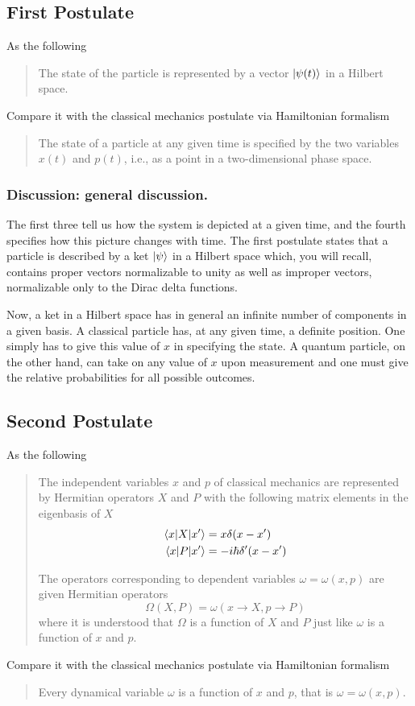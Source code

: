 \documentclass[../../../main.tex]{subfiles}
\begin{document}
\subsection{First Postulate}
As the following
\begin{quotation}
    The state of the particle is represented by a vector $\ket{\psi(t)}$ in a Hilbert space.
\end{quotation}
Compare it with the classical mechanics postulate via Hamiltonian formalism
\begin{quotation}
    The state of a particle at any given time is specified by the two variables $x(t)$ and $p(t)$, i.e., as a point in a two-dimensional phase space.
\end{quotation}

\subsubsection{Discussion: general discussion.}
The first three tell us how the system is depicted at a given time, and the fourth specifies how this picture changes with time.
The first postulate states that a particle is described by a ket $\ket{\psi} $ in a Hilbert space which, you will recall, contains proper vectors normalizable to unity as well as improper vectors, normalizable only to the Dirac delta functions.

Now, a ket in a Hilbert space has in general an infinite number of components in a given basis.
A classical particle has, at any given time, a definite position.
One simply has to give this value of $x$ in specifying the state.
A quantum particle, on the other hand, can take on any value of $x$ upon measurement and one must give the relative probabilities for all possible outcomes.

\subsection{Second Postulate}
As the following
\begin{quotation}
    The independent variables $x$ and $p$ of classical mechanics are represented by Hermitian operators $X$ and $P$ with the following matrix elements in the eigenbasis of $X$
    \begin{align*}
        \braket{x|X|x'} & =x\delta(x-x')         \\
        \braket{x|P|x'} & =-i\hbar \delta'(x-x')
    \end{align*}

    The operators corresponding to dependent variables $\omega=\omega(x,p)$ are given Hermitian operators
    \begin{equation*}
        \Omega(X,P)=\omega \left( x\rightarrow X, p\rightarrow P \right)
    \end{equation*}
    where it is understood that $\Omega$ is a function of $X$ and $P$ just like $\omega$ is a function of $x$ and $p$.
\end{quotation}
Compare it with the classical mechanics postulate via Hamiltonian formalism
\begin{quotation}
    Every dynamical variable $\omega$ is a function of $x$ and $p$, that is $\omega=\omega(x,p)$.
\end{quotation}
\end{document}
